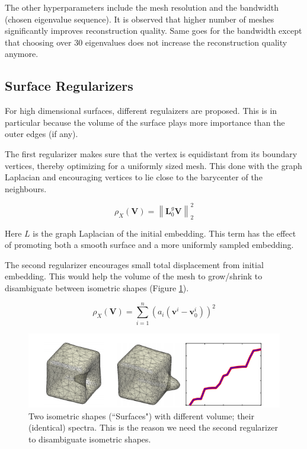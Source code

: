 \documentclass[a4paper,10pt]{article}
\begin{document}
The other hyperparameters include the mesh resolution and the bandwidth (chosen eigenvalue sequence). It is observed that higher number of meshes significantly improves reconstruction quality. Same goes for the bandwidth except that choosing over 30 eigenvalues does not increase the reconstruction quality anymore.

\subsection{Surface Regularizers}

For high dimensional surfaces, different regulaizers are proposed. This is in particular because the volume of the surface plays more importance than the outer edges (if any). 

The first regularizer makes sure that the vertex is equidistant from its boundary vertices, thereby optimizing for a uniformly sized mesh. This done with the graph Laplacian and encouraging vertices to lie close to the barycenter of the neighbours. 

    \begin{equation}
 \rho_{X}(\mathbf{V}) = \left\| \mathbf{L}_0^g \mathbf{V}  \right\|_{2}^{2}
    \end{equation}
    
Here $L$ is the graph Laplacian of the initial embedding.
This term has the effect of promoting both a smooth surface
and a more uniformly sampled embedding.

The second regularizer encourages small total displacement from initial embedding. This would help the volume of the mesh to grow/shrink to disambiguate between isometric shapes (Figure \ref{fig:Surfaces}).

    \begin{equation}
    \rho_{X}(\mathbf{V})=\sum_{i=1}^{n}\left(a_{i}\left(\mathbf{v}^{i}-\mathbf{v}_{0}^{i}\right)\right)^{2}
    \end{equation}


\begin{figure}
 \includegraphics[width=\textwidth]{Surfaces}
 \caption{\label{fig:Surfaces} Two isometric shapes (``Surfaces") with different volume; their (identical) spectra. This is the reason we need the second regularizer to disambiguate isometric shapes.}
\end{figure}
\end{document}
